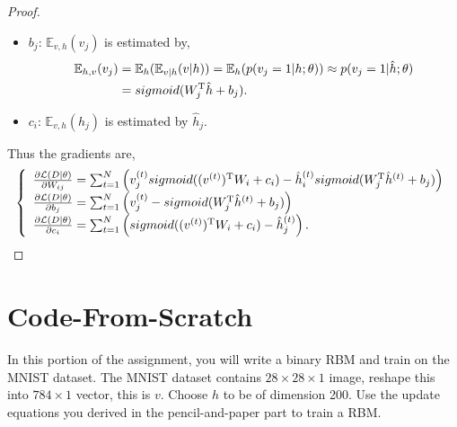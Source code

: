 \documentclass[12pt]{article}
\newcommand{\E}{\mathbb{E}}
\newcommand{\1}{\mathbf{1}}
\begin{document}
{\begin{itemize}
\begin{proof}
\begin{itemize}
        \begin{align*}
          \E_{h,v}(v_jh_i) &= \E_h(h_i\E_{v|h}(v|h)) = \E_{h}(h_ip(v_j=1|h; \theta)) \approx \hat{h}_i p(v_j=1|\hat{h}; \theta) \\
          &= \hat{h}_i sigmoid(W_j^{\rm T} \hat{h} + b_j).
        \end{align*}
        \item $b_j$: $\E_{v,h}(v_j)$ is estimated by,
        \begin{align*}
          \E_{h,v}(v_j) &= \E_h(\E_{v|h}(v|h)) = \E_{h}(p(v_j=1|h; \theta)) \approx p(v_j=1|\hat{h}; \theta) \\
          &= sigmoid(W_j^{\rm T} \hat{h} + b_j).
        \end{align*}
        \item $c_i$: $\E_{v,h}(h_j)$ is estimated by $\hat{h}_j$.
      \end{itemize}
      Thus the gradients are,
      \begin{align*}
        \left\{ \begin{array}{ll}
          \frac{\partial \mathcal{L}(D|\theta)}{\partial W_{ij}} = \sum_{t=1}^N \left( v_j^{(t)} sigmoid((v^{(t)})^{\rm T}W_i + c_i)  -  \hat{h}_i^{(t)} sigmoid(W_j^{\rm T} \hat{h}^{(t)} + b_j) \right)\\
          \frac{\partial \mathcal{L}(D|\theta)}{\partial b_j} = \sum_{t=1}^N \left( v_j^{(t)} -  sigmoid(W_j^{\rm T} \hat{h}^{(t)} + b_j) \right)\\
          \frac{\partial \mathcal{L}(D|\theta)}{\partial c_i} =\sum_{t=1}^N \left( sigmoid((v^{(t)})^{\rm T} W_i + c_i)   - \hat{h}_j^{(t)}\right).
        \end{array}\right.
      \end{align*}
    \end{proof}
\end{itemize}

\section{Code-From-Scratch}
In this portion of the assignment, you will write a binary RBM and train on the MNIST dataset. The MNIST dataset contains $28\times 28 \times 1$ image, reshape this into $784\times 1$ vector, this is $v$. Choose $h$ to be of dimension 200. Use the update equations you derived in the pencil-and-paper part to train a RBM. 

}
\end{document}
